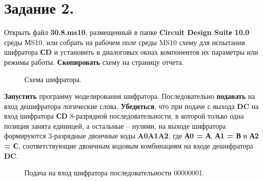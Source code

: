 \documentclass[spec, och, otchet, hidelinks]{SCWorks}
\begin{document}
\newpage 

\section*{Задание 2.}

\par Открыть файл \textbf{30.8.ms10}, размещенный в папке 
\textbf{Circuit Design Suitе 10.0} среды МS10, или собрать на рабочем поле 
среды MS10 схему для испытания шифратора \textbf{СD} и установить в диалоговых окнах 
компонентов их параметры или режимы работы. \textbf{Скопировать} схему на страницу отчета.

\begin{figure}[h]
	\caption{Схема шифратора.}
\end{figure}

\newpage

\par \textbf{Запустить} программу моделирования шифратора. Последовательно 
\textbf{подавать} на вход дешифратора логические слова. \textbf{Убедиться}, что при 
подаче с выхода \textbf{DC} на вход шифратора \textbf{СD} 8-разрядной 
последовательности, в которой только одна позиция занята единицей, а остальные 
– нулями, на выходе шифратора формируются 3-разрядные двоичные коды 
\textbf{A0A1A2}, где \textbf{А0 = А}, \textbf{А1 = В} и \textbf{А2 = С}, 
соответствующие двоичным кодовым комбинациям на входе дешифратора \textbf{DC}.

\begin{figure}[h]
	\caption{Подача на вход шифратора последовательности 00000001.}
\end{figure}
\end{document}
